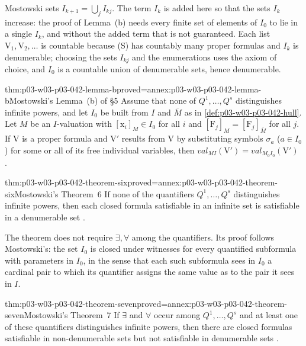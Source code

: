 Mostowski sets \(I_{k+1}=\bigcup_jI_{kj}\).  The term \(I_k\) is added
here so that the sets \(I_k\) increase: the proof of Lemma~(b) needs every
finite set of elements of \(I_0\) to lie in a single \(I_k\), and without
the added term that is not guaranteed.  Each list \(\mathrm V_1,\mathrm
V_2,\ldots\) is countable because (S) has countably many proper formulas
and \(I_k\) is denumerable; choosing the sets \(I_{kj}\) and the
enumerations uses the axiom of choice, and \(I_0\) is a countable union of
denumerable sets, hence denumerable.

\begin{hblemma}{thm:p03-w03-p03-042-lemma-b}{proved=annex:p03-w03-p03-042-lemma-b}{Mostowski's Lemma~(b) of \S5}
Assume that none of \(Q^1,\ldots,Q^s\) distinguishes infinite powers, and
let \(I_0\) be built from \(I\) and \(\overline M\) as in
\cref{def:p03-w03-p03-042-hull}.  Let \(M\) be an \(I\)-valuation with
\([\mathrm x_i]_M\in I_0\) for all \(i\) and \([\mathrm F_j]_M=[\mathrm
F_j]_{\overline M}\) for all \(j\).  If \(\mathrm V\) is a proper formula
and \(\mathrm V'\) results from \(\mathrm V\) by substituting symbols
\(\sigma_a\) (\(a\in I_0\)) for some or all of its free individual
variables, then \(\mathit{val}_{MI}(\mathrm V')=\mathit{val}_{M_0I_0}
(\mathrm V')\) \cite[p.~22]{Mostowski1957}.
\end{hblemma}

\begin{hbtheorem}{thm:p03-w03-p03-042-theorem-six}{proved=annex:p03-w03-p03-042-theorem-six}{Mostowski's Theorem~6}
If none of the quantifiers \(Q^1,\ldots,Q^s\) distinguishes infinite
powers, then each closed formula satisfiable in an infinite set is
satisfiable in a denumerable set \cite[p.~20]{Mostowski1957}.
\end{hbtheorem}

The theorem does not require \(\exists,\forall\) among the quantifiers.
Its proof follows Mostowski's: the set \(I_0\) is closed under witnesses
for every quantified subformula with parameters in \(I_0\), in the sense
that each such subformula sees in \(I_0\) a cardinal pair to which its
quantifier assigns the same value as to the pair it sees in \(I\).

\begin{hbtheorem}{thm:p03-w03-p03-042-theorem-seven}{proved=annex:p03-w03-p03-042-theorem-seven}{Mostowski's Theorem~7}
If \(\exists\) and \(\forall\) occur among \(Q^1,\ldots,Q^s\) and at least
one of these quantifiers distinguishes infinite powers, then there are
closed formulas satisfiable in non-denumerable sets but not satisfiable in
denumerable sets \cite[p.~24]{Mostowski1957}.
\end{hbtheorem}

